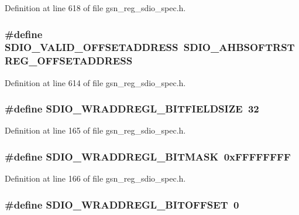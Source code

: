 Definition at line 618 of file gsn\_\-reg\_\-sdio\_\-spec.h.

\hypertarget{a00571_a5bba14bea2b791f926e150b47bd03783}{
\subsubsection[{SDIO\_\-VALID\_\-OFFSETADDRESS}]{\setlength{\rightskip}{0pt plus 5cm}\#define SDIO\_\-VALID\_\-OFFSETADDRESS~SDIO\_\-AHBSOFTRSTREG\_\-OFFSETADDRESS}}
\label{a00571_a5bba14bea2b791f926e150b47bd03783}


Definition at line 614 of file gsn\_\-reg\_\-sdio\_\-spec.h.

\hypertarget{a00571_aeaa9ea64ccdeafb6a3f811a5be3d1086}{
\subsubsection[{SDIO\_\-WRADDREGL\_\-BITFIELDSIZE}]{\setlength{\rightskip}{0pt plus 5cm}\#define SDIO\_\-WRADDREGL\_\-BITFIELDSIZE~32}}
\label{a00571_aeaa9ea64ccdeafb6a3f811a5be3d1086}


Definition at line 165 of file gsn\_\-reg\_\-sdio\_\-spec.h.

\hypertarget{a00571_add1a25723af17ee47387fe4a6d1a3c8e}{
\subsubsection[{SDIO\_\-WRADDREGL\_\-BITMASK}]{\setlength{\rightskip}{0pt plus 5cm}\#define SDIO\_\-WRADDREGL\_\-BITMASK~0xFFFFFFFF}}
\label{a00571_add1a25723af17ee47387fe4a6d1a3c8e}


Definition at line 166 of file gsn\_\-reg\_\-sdio\_\-spec.h.

\hypertarget{a00571_a88b70f04885f6b3f9f8134dac611f150}{
\subsubsection[{SDIO\_\-WRADDREGL\_\-BITOFFSET}]{\setlength{\rightskip}{0pt plus 5cm}\#define SDIO\_\-WRADDREGL\_\-BITOFFSET~0}}
\label{a00571_a88b70f04885f6b3f9f8134dac611f150}


